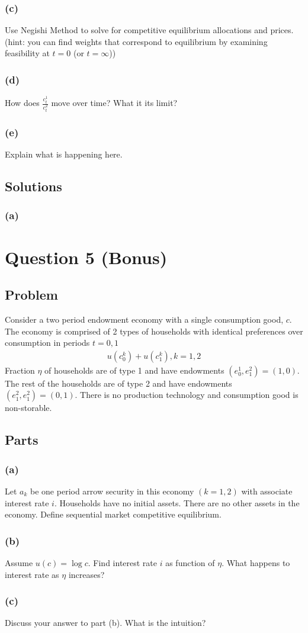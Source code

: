 \documentclass[10pt, a4paper]{article}
\begin{document}
    \subsubsection*{(c)}
      Use Negishi Method to solve for competitive equilibrium allocations and prices. (hint: you can find weights that correspond to equilibrium by examining feasibility at $t = 0$ (or $t = \infty$))
    \subsubsection*{(d)}
      How does $\frac{c^1_t}{c^2_t}$ move over time? What it its limit?
    \subsubsection*{(e)}
      Explain what is happening here.
  \subsection*{Solutions}
    \subsubsection*{(a)}
      
\section*{Question 5 (Bonus)}
  \subsection*{Problem}
    Consider a two period endowment economy with a single consumption good, $c$. The economy is comprised of 2 types of households with identical preferences over consumption in periods $t = 0,1$
    \begin{gather*}
      u(c^k_0) + u(c^k_1), k = 1,2
    \end{gather*}
    Fraction $\eta$ of households are of type 1 and have endowments $(e^1_0, e^2_1) = (1,0)$. The rest of the households are of type 2 and have endowments $(e^2_1, e^2_1) = (0,1)$. There is no production technology and consumption good is non-storable.
  \subsection*{Parts}
    \subsubsection*{(a)}
      Let $a_k$ be one period arrow security in this economy $(k = 1,2)$ with associate interest rate $i$. Households have no initial assets. There are no other assets in the economy. Define sequential market competitive equilibrium.
    \subsubsection*{(b)}
      Assume $u(c) = \log c$. Find interest rate $i$ as function of $\eta$. What happens to interest rate as $\eta$ increases?
    \subsubsection*{(c)}
      Discuss your answer to part (b). What is the intuition?
\end{document}
